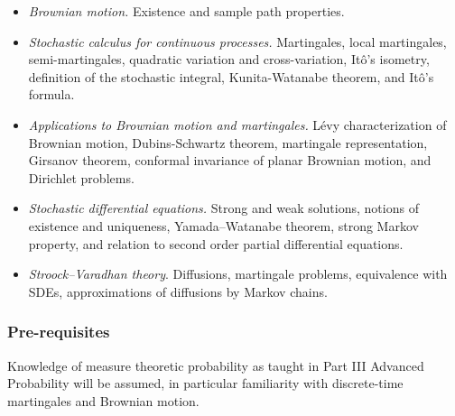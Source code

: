 \documentclass[a4paper]{article}
\begin{document}
\maketitle
{\small
\setlength{\parindent}{0em}
\setlength{\parskip}{1em}
\begin{itemize}
 \item \textit{Brownian motion.} Existence and sample path properties.
 \item \textit{Stochastic calculus for continuous processes.} Martingales, local martingales, semi-martingales, quadratic variation and cross-variation, It\^o's isometry, definition of the stochastic integral, Kunita-Watanabe theorem, and It\^o's formula.
 \item \textit{Applications to Brownian motion and martingales.} L\'evy characterization of Brownian motion, Dubins-Schwartz theorem, martingale representation, Girsanov theorem, conformal invariance of planar Brownian motion, and Dirichlet problems.
 \item \textit{Stochastic differential equations.} Strong and weak solutions, notions of existence and uniqueness, Yamada--Watanabe theorem, strong Markov property, and relation to second order partial differential equations.
 \item \textit{Stroock--Varadhan theory}. Diffusions, martingale problems, equivalence with SDEs, approximations of diffusions by Markov chains.
\end{itemize}
\subsubsection*{Pre-requisites}
Knowledge of measure theoretic probability as taught in Part III Advanced Probability will be assumed, in particular familiarity with discrete-time martingales and Brownian motion.
}
\tableofcontents

\printindex
\end{document}
